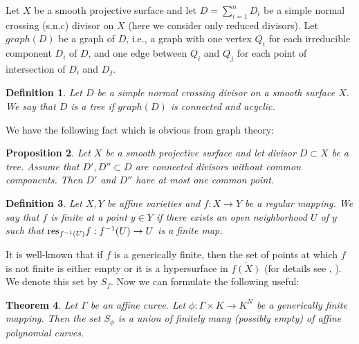 \documentclass{amsproc}
\newtheorem{defi}{Definition}[section]
\newtheorem{theo}[defi]{Theorem}
\newtheorem{pr}[defi]{Proposition}
\begin{document}
Let $X$ be a smooth projective surface and let $D=\sum_{i=1}^n
D_i$ be a simple normal crossing (s.n.c) divisor on $X$ (here we
consider only reduced divisors). Let $graph(D)$ be a graph of $D$,
i.e., a graph with one vertex $Q_i$ for each irreducible component
$D_i$  of $D$, and one edge between $Q_i$ and $Q_j$ for each point
of intersection of $D_i$ and $D_j$.

\begin{defi}
Let $D$ be a simple normal crossing divisor on a smooth surface
$X.$ We say that $D$ is a \emph{tree} if $graph(D)$ is connected and
acyclic.
\end{defi}

We have the following fact which is obvious from graph theory:

\begin{pr}\label{acykl}
Let $X$ be a smooth projective surface and let  divisor $D\subset
X$ be a tree. Assume that $D', D''\subset D$ are connected
divisors without common components. Then  $D'$ and  $D''$ have at
most one common point.
\end{pr}

\begin{defi}
Let $X, Y$ be affine varieties and $f : X \rightarrow Y$ be a
regular  mapping. We say that $f$ \emph{is finite} at a point $y
\in Y$ if there exists an open neighborhood $U$ of  $y$ such that
$ {\rm res}_{f^{-1}(U)} f :f^{-1}  (U)\rightarrow U$ is a finite
map.
\end{defi}

It is well-known that if $f$ is a generically finite, then the set
of points at which $f$ is not finite is either empty or it is a
hypersurface in $\overline{f(X)}$ (for details see \cite{jel?},
\cite{jel2}). We denote this set by $S_f.$ Now we can formulate
the following useful:

\begin{theo}\label{gl1}
Let $\Gamma$ be an affine curve. Let $\phi : \Gamma\times K\to
K^N$ be a generically finite mapping. Then the set $S_{\phi}$ is a
union of finitely many (possibly empty) of affine polynomial
curves.
\end{theo}
\end{document}
